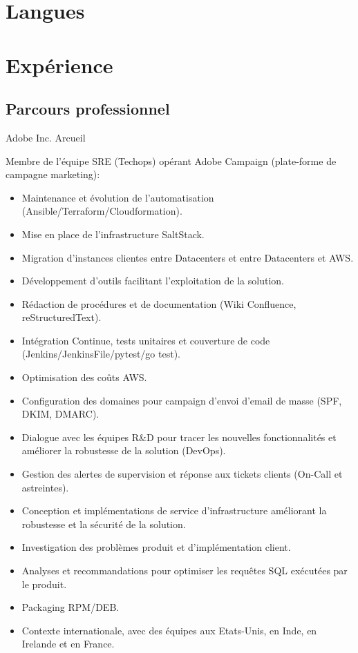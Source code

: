 \documentclass[10pt,a4paper,sans]{moderncv}        %
\begin{document}
\section{Langues}


\section{Expérience}
\subsection{Parcours professionnel}


              {Adobe Inc.}
              {Arcueil}
              {}
	      {Membre de l'équipe SRE (Techops) opérant Adobe Campaign (plate-forme de campagne marketing):
                 \begin{itemize}
                 \item Maintenance et évolution de l'automatisation (Ansible/Terraform/Cloudformation).
                 \item Mise en place de l'infrastructure SaltStack.
                 \item Migration d'instances clientes entre Datacenters et entre Datacenters et AWS.
                 \item Développement d'outils facilitant l'exploitation de la solution.
                 \item Rédaction de procédures et de documentation (Wiki Confluence, reStructuredText).
		 \item Intégration Continue, tests unitaires et couverture de code (Jenkins/JenkinsFile/pytest/go test).
                 \item Optimisation des coûts AWS.
		 \item Configuration des domaines pour campaign d'envoi d'email de masse (SPF, DKIM, DMARC).
                 \item Dialogue avec les équipes R\&D pour tracer les nouvelles fonctionnalités et améliorer la robustesse de la solution (DevOps).
                 \item Gestion des alertes de supervision et réponse aux tickets clients (On-Call et astreintes).
		 \item Conception et implémentations de service d'infrastructure améliorant la robustesse et la sécurité de la solution.
                 \item Investigation des problèmes produit et d'implémentation client.
		 \item Analyses et recommandations pour optimiser les requêtes SQL exécutées par le produit.
		 \item Packaging RPM/DEB.
		 \item Contexte internationale, avec des équipes aux Etats-Unis, en Inde, en Irelande et en France.
                 \end{itemize}
              }
\end{document}
